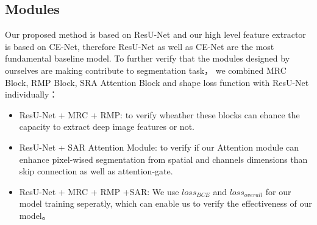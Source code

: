 \documentclass{ieeeaccess}
\begin{document}
  \subsection{Modules}
  Our proposed method is based on ResU-Net and our high level feature extractor is based on CE-Net, therefore ResU-Net as well as CE-Net are the most fundamental baseline model.
    To further verify that the modules designed by ourselves are making contribute to segmentation task，
    we combined MRC Block, RMP Block, SRA Attention Block and shape loss function with ResU-Net individually：
    \begin{itemize}
  \item ResU-Net + MRC + RMP: to verify wheather these blocks can ehance the capacity to extract deep image features or not.
  \item ResU-Net + SAR Attention Module: to verify if our Attention module can enhance pixel-wised segmentation from spatial and channels dimensions than skip connection as well as
  attention-gate.
  \item ResU-Net + MRC + RMP +SAR: We use \(loss_{BCE}\) and \(loss_{overall}\) for our model training seperatly, which can enable us to verify the effectiveness of our model。
    \end{itemize}
  
\end{document}
